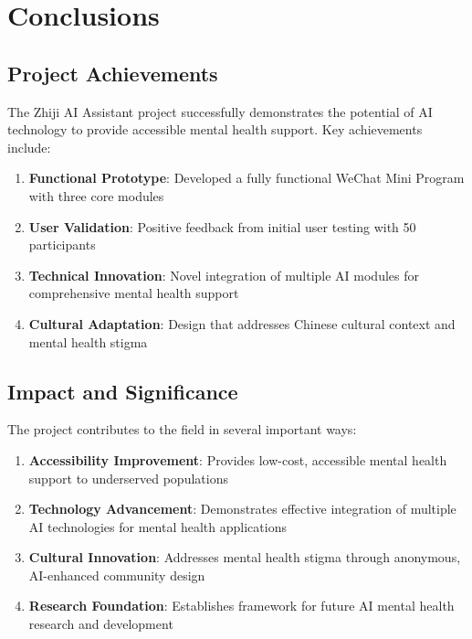 \section{Conclusions}
\label{sec:conclusions}

\subsection{Project Achievements}

The Zhiji AI Assistant project successfully demonstrates the potential of AI technology to provide accessible mental health support. Key achievements include:

\begin{enumerate}
    \item \textbf{Functional Prototype}: Developed a fully functional WeChat Mini Program with three core modules
    \item \textbf{User Validation}: Positive feedback from initial user testing with 50 participants
    \item \textbf{Technical Innovation}: Novel integration of multiple AI modules for comprehensive mental health support
    \item \textbf{Cultural Adaptation}: Design that addresses Chinese cultural context and mental health stigma
\end{enumerate}

\subsection{Impact and Significance}

The project contributes to the field in several important ways:

\begin{enumerate}
    \item \textbf{Accessibility Improvement}: Provides low-cost, accessible mental health support to underserved populations
    \item \textbf{Technology Advancement}: Demonstrates effective integration of multiple AI technologies for mental health applications
    \item \textbf{Cultural Innovation}: Addresses mental health stigma through anonymous, AI-enhanced community design
    \item \textbf{Research Foundation}: Establishes framework for future AI mental health research and development
\end{enumerate}

